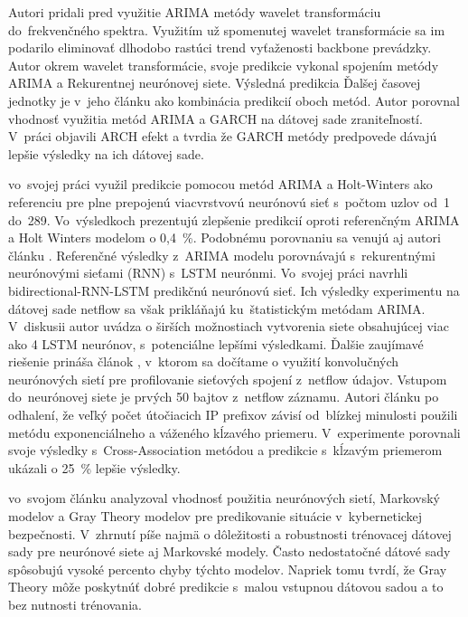 \documentclass[thesismargins, thesislinespacing, openright, upjsfrontpage]{rnthesis}
\begin{document}
Autori \cite{madan2018predicting,papagiannaki2005long} pridali pred využitie ARIMA metódy wavelet transformáciu do~frekvenčného spektra. Využitím už spomenutej wavelet transformácie sa im podarilo eliminovať dlhodobo rastúci trend vyťaženosti backbone prevádzky. Autor \cite{madan2018predicting} okrem wavelet transformácie, svoje predikcie vykonal spojením metódy ARIMA a Rekurentnej neurónovej siete. Výsledná predikcia Ďalšej časovej jednotky je v~jeho článku ako kombinácia predikcií oboch metód. Autor \cite{tang2016exploiting} porovnal vhodnosť využitia metód ARIMA a GARCH na dátovej sade zraniteľností. V~práci objavili ARCH efekt a tvrdia že GARCH metódy predpovede dávajú lepšie výsledky na ich dátovej sade.

\cite{cortez2012multi} vo~svojej práci využil predikcie pomocou metód ARIMA a Holt-Winters ako referenciu pre plne prepojenú viacvrstvovú neurónovú sieť s~počtom uzlov od~1 do~289. Vo~výsledkoch prezentujú zlepšenie predikcií oproti referenčným ARIMA a Holt Winters modelom o 0,4~\%. Podobnému porovnaniu sa venujú aj autori článku \cite{fang2019deep}. Referenčné výsledky z~ARIMA modelu porovnávajú s~rekurentnými neurónovými sieťami (RNN) s~LSTM neurónmi. Vo~svojej práci navrhli bidirectional-RNN-LSTM predikčnú neurónovú sieť. Ich výsledky experimentu na dátovej sade netflow sa však prikláňajú ku~štatistickým metódam ARIMA. V~diskusii autor uvádza o širších možnostiach vytvorenia siete obsahujúcej viac ako 4 LSTM neurónov, s~potenciálne lepšími výsledkami. Ďalšie zaujímavé riešenie prináša článok \cite{millar2019using}, v~ktorom sa dočítame o využití konvolučných neurónových sietí pre profilovanie sieťových spojení z~netflow údajov. Vstupom do~neurónovej siete je prvých 50 bajtov z~netflow záznamu. Autori článku \cite{soldo2011blacklisting} po odhalení, že veľký počet útočiacich IP prefixov závisí od~blízkej minulosti použili metódu exponenciálneho a váženého kĺzavého priemeru. V~experimente porovnali svoje výsledky s~Cross-Association metódou a predikcie s~kĺzavým priemerom ukázali o 25~\% lepšie výsledky.

\cite{Leau2015} vo~svojom článku analyzoval vhodnosť použitia neurónových sietí, Markovský modelov a Gray Theory modelov pre predikovanie situácie v~kybernetickej bezpečnosti. V~zhrnutí píše najmä o dôležitosti a robustnosti trénovacej dátovej sady pre neurónové siete aj Markovské modely. Často nedostatočné dátové sady spôsobujú vysoké percento chyby týchto modelov. Napriek tomu tvrdí, že Gray Theory môže poskytnúť dobré predikcie s~malou vstupnou dátovou sadou a to bez nutnosti trénovania.
\end{document}

